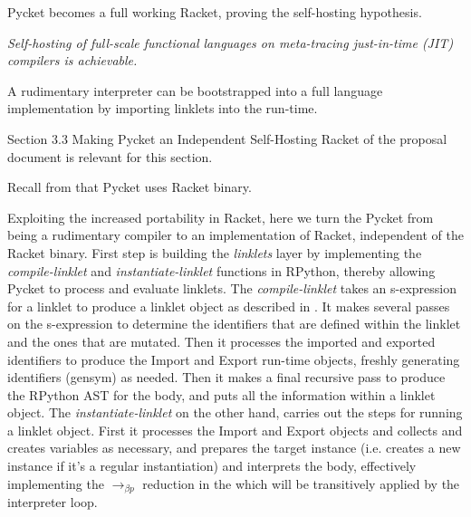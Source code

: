 		\begin{mainpoint}
            Pycket becomes a full working Racket, proving the self-hosting hypothesis.

			\textit{Self-hosting of full-scale functional languages on meta-tracing just-in-time (JIT) compilers is achievable.}
        \end{mainpoint}

        \begin{todo}
			A rudimentary interpreter can be bootstrapped into a full language implementation by importing linklets into the run-time.
		\end{todo}

		\begin{todo}[Import]
			Section 3.3 Making Pycket an Independent Self-Hosting Racket of the proposal document is relevant for this section.
		\end{todo}

Recall from  that Pycket uses Racket binary.



		Exploiting the increased portability in Racket, here we turn the
Pycket from being a rudimentary compiler to an implementation of
Racket, independent of the Racket binary. First step is building the
\emph{linklets} layer by implementing the \emph{compile-linklet} and
\emph{instantiate-linklet} functions in RPython, thereby allowing
Pycket to process and evaluate linklets. The \emph{compile-linklet}
takes an s-expression for a linklet to produce a linklet object as
described in . It makes several
passes on the s-expression to determine the identifiers that are
defined within the linklet and the ones that are mutated. Then it
processes the imported and exported identifiers to produce the Import
and Export run-time objects, freshly generating identifiers (gensym)
as needed. Then it makes a final recursive pass to produce the RPython
AST for the body, and puts all the information within a linklet
object. The \emph{instantiate-linklet} on the other hand, carries out
the steps for running a linklet object. First it processes the Import
and Export objects and collects and creates variables as necessary,
and prepares the target instance (i.e. creates a new instance if it's
a regular instantiation) and interprets the body, effectively
implementing the $\longrightarrow_{\beta p}$ reduction in the 
which will be transitively applied by the interpreter loop.

